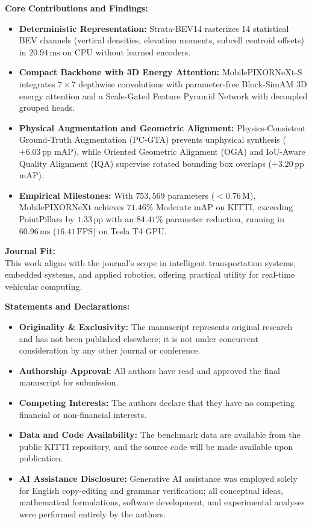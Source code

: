 \documentclass[10.5pt,a4paper]{article}
\begin{document}
\vspace{0.5em}\noindent
\textbf{Core Contributions and Findings:}
\begin{itemize}\setlength{\itemsep}{0.1em}\setlength{\parskip}{0pt}
    \item \textbf{Deterministic Representation:} Strata-BEV14 rasterizes 14 statistical BEV channels (vertical densities, elevation moments, subcell centroid offsets) in $20.94\,\text{ms}$ on CPU without learned encoders.
    \item \textbf{Compact Backbone with 3D Energy Attention:} MobilePIXORNeXt-S integrates $7 \times 7$ depthwise convolutions with parameter-free Block-SimAM 3D energy attention and a Scale-Gated Feature Pyramid Network with decoupled grouped heads.
    \item \textbf{Physical Augmentation and Geometric Alignment:} Physics-Consistent Ground-Truth Augmentation (PC-GTA) prevents unphysical synthesis ($+6.03\,\text{pp}$ mAP), while Oriented Geometric Alignment (OGA) and IoU-Aware Quality Alignment (IQA) supervise rotated bounding box overlaps ($+3.20\,\text{pp}$ mAP).
    \item \textbf{Empirical Milestones:} With $753{,}569$ parameters ($<0.76\,\text{M}$), MobilePIXORNeXt achieves $71.46\%$ Moderate mAP on KITTI, exceeding PointPillars by $1.33\,\text{pp}$ with an $84.41\%$ parameter reduction, running in $60.96\,\text{ms}$ ($16.41\,\text{FPS}$) on Tesla T4 GPU.
\end{itemize}

\vspace{0.5em}\noindent
\textbf{Journal Fit:}\\
This work aligns with the journal's scope in intelligent transportation systems, embedded systems, and applied robotics, offering practical utility for real-time vehicular computing.

\vspace{0.5em}\noindent
\textbf{Statements and Declarations:}
\begin{itemize}\setlength{\itemsep}{0.1em}\setlength{\parskip}{0pt}
    \item \textbf{Originality \& Exclusivity:} The manuscript represents original research and has not been published elsewhere; it is not under concurrent consideration by any other journal or conference.
    \item \textbf{Authorship Approval:} All authors have read and approved the final manuscript for submission.
    \item \textbf{Competing Interests:} The authors declare that they have no competing financial or non-financial interests.
    \item \textbf{Data and Code Availability:} The benchmark data are available from the public KITTI repository, and the source code will be made available upon publication.
    \item \textbf{AI Assistance Disclosure:} Generative AI assistance was employed solely for English copy-editing and grammar verification; all conceptual ideas, mathematical formulations, software development, and experimental analyses were performed entirely by the authors.
\end{itemize}
\end{document}

